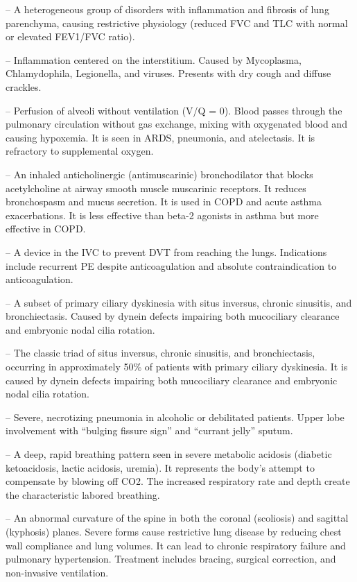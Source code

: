 -- A heterogeneous group of disorders with inflammation and fibrosis of lung parenchyma, causing restrictive physiology (reduced FVC and TLC with normal or elevated FEV1/FVC ratio).

-- Inflammation centered on the interstitium. Caused by Mycoplasma, Chlamydophila, Legionella, and viruses. Presents with dry cough and diffuse crackles.

-- Perfusion of alveoli without ventilation (V/Q = 0). Blood passes through the pulmonary circulation without gas exchange, mixing with oxygenated blood and causing hypoxemia. It is seen in ARDS, pneumonia, and atelectasis. It is refractory to supplemental oxygen.

-- An inhaled anticholinergic (antimuscarinic) bronchodilator that blocks acetylcholine at airway smooth muscle muscarinic receptors. It reduces bronchospasm and mucus secretion. It is used in COPD and acute asthma exacerbations. It is less effective than beta-2 agonists in asthma but more effective in COPD.

-- A device in the IVC to prevent DVT from reaching the lungs. Indications include recurrent PE despite anticoagulation and absolute contraindication to anticoagulation.

-- A subset of primary ciliary dyskinesia with situs inversus, chronic sinusitis, and bronchiectasis. Caused by dynein defects impairing both mucociliary clearance and embryonic nodal cilia rotation.

-- The classic triad of situs inversus, chronic sinusitis, and bronchiectasis, occurring in approximately 50\% of patients with primary ciliary dyskinesia. It is caused by dynein defects impairing both mucociliary clearance and embryonic nodal cilia rotation.

-- Severe, necrotizing pneumonia in alcoholic or debilitated patients. Upper lobe involvement with ``bulging fissure sign'' and ``currant jelly'' sputum.

-- A deep, rapid breathing pattern seen in severe metabolic acidosis (diabetic ketoacidosis, lactic acidosis, uremia). It represents the body's attempt to compensate by blowing off CO2. The increased respiratory rate and depth create the characteristic labored breathing.

-- An abnormal curvature of the spine in both the coronal (scoliosis) and sagittal (kyphosis) planes. Severe forms cause restrictive lung disease by reducing chest wall compliance and lung volumes. It can lead to chronic respiratory failure and pulmonary hypertension. Treatment includes bracing, surgical correction, and non-invasive ventilation.

